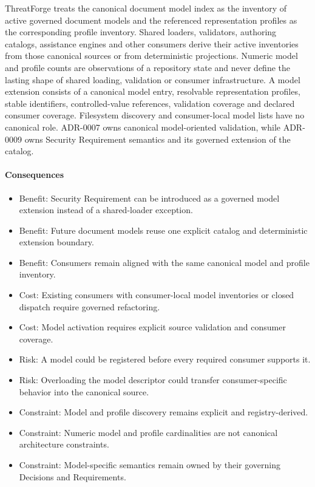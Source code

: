 \documentclass[
  10pt,
]{article}
\providecommand{\tightlist}{%
  \setlength{\itemsep}{0pt}\setlength{\parskip}{0pt}}
\begin{document}
ThreatForge treats the canonical document model index as the inventory
of active governed document models and the referenced representation
profiles as the corresponding profile inventory. Shared loaders,
validators, authoring catalogs, assistance engines and other consumers
derive their active inventories from those canonical sources or from
deterministic projections. Numeric model and profile counts are
observations of a repository state and never define the lasting shape of
shared loading, validation or consumer infrastructure. A model extension
consists of a canonical model entry, resolvable representation profiles,
stable identifiers, controlled-value references, validation coverage and
declared consumer coverage. Filesystem discovery and consumer-local
model lists have no canonical role. ADR-0007 owns canonical
model-oriented validation, while ADR-0009 owns Security Requirement
semantics and its governed extension of the catalog.

\paragraph{Consequences}\label{consequences-16}

\begin{itemize}
\tightlist
\item
  Benefit: Security Requirement can be introduced as a governed model
  extension instead of a shared-loader exception.
\item
  Benefit: Future document models reuse one explicit catalog and
  deterministic extension boundary.
\item
  Benefit: Consumers remain aligned with the same canonical model and
  profile inventory.
\item
  Cost: Existing consumers with consumer-local model inventories or
  closed dispatch require governed refactoring.
\item
  Cost: Model activation requires explicit source validation and
  consumer coverage.
\item
  Risk: A model could be registered before every required consumer
  supports it.
\item
  Risk: Overloading the model descriptor could transfer
  consumer-specific behavior into the canonical source.
\item
  Constraint: Model and profile discovery remains explicit and
  registry-derived.
\item
  Constraint: Numeric model and profile cardinalities are not canonical
  architecture constraints.
\item
  Constraint: Model-specific semantics remain owned by their governing
  Decisions and Requirements.
\end{itemize}
\end{document}
